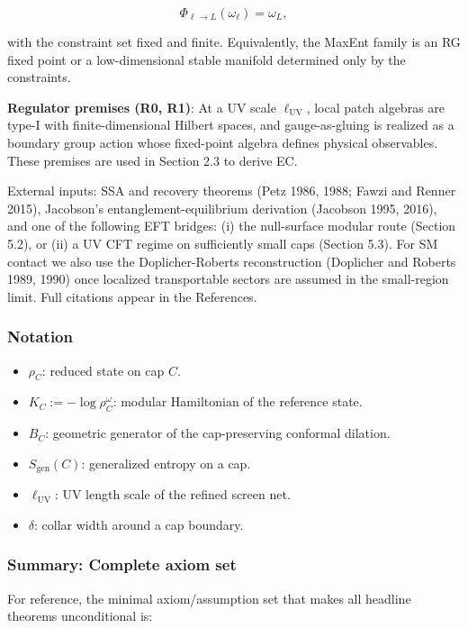 \documentclass[11pt,a4paper]{article}
\theoremstyle{remark}
\providecommand{\tightlist}{%
  \setlength{\itemsep}{0pt}\setlength{\parskip}{0pt}}
\begin{document}
\[
\Phi_{\ell\to L}(\omega_{\ell}) = \omega_{L},
\]

with the constraint set fixed and finite. Equivalently, the MaxEnt family is
an RG fixed point or a low-dimensional stable manifold determined only by the
constraints.

\textbf{Regulator premises (R0, R1)}: At a UV scale \(\ell_{\mathrm{UV}}\), local patch algebras are
type-I with finite-dimensional Hilbert spaces, and gauge-as-gluing is realized
as a boundary group action whose fixed-point algebra defines physical
observables. These premises are used in Section 2.3 to derive EC.

External inputs: SSA and recovery theorems (Petz 1986, 1988; Fawzi and Renner
2015), Jacobson's entanglement-equilibrium derivation (Jacobson 1995, 2016),
and one of the following EFT bridges: (i) the null-surface modular route
(Section 5.2), or (ii) a UV CFT regime on sufficiently small caps (Section
5.3). For SM contact we also use the Doplicher-Roberts reconstruction
(Doplicher and Roberts 1989, 1990) once localized transportable sectors are
assumed in the small-region limit. Full citations appear in the References.

\subsubsection{Notation}\label{notation}

\begin{itemize}
\tightlist
\item
  \(\rho_C\): reduced state on cap \(C\).
\item
  \(K_C := -\log \rho_C^{\omega}\): modular Hamiltonian of the reference state.
\item
  \(B_C\): geometric generator of the cap-preserving conformal dilation.
\item
  \(S_{\mathrm{gen}}(C)\): generalized entropy on a cap.
\item
  \(\ell_{\mathrm{UV}}\): UV length scale of the refined screen net.
\item
  \(\delta\): collar width around a cap boundary.
\end{itemize}

\subsubsection{Summary: Complete axiom set}\label{summary-complete-axiom-set}

For reference, the minimal axiom/assumption set that makes all headline theorems
unconditional is:
\end{document}
